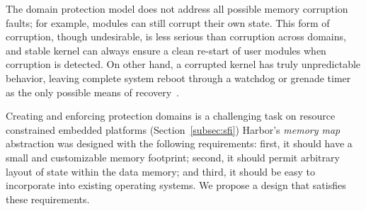 The domain protection model does not address all possible memory corruption
faults; for example,
% 
modules can still corrupt their own state.
% 
This form of corruption, though undesirable, is less serious than
corruption across domains, and stable kernel can always ensure a clean
re-start of user modules when corruption is detected.
% 
On other hand, a corrupted kernel has truly unpredictable behavior,
leaving complete system reboot through a watchdog or grenade timer as
the only possible means of recovery~\cite{dutta05ipsn}.
%


Creating and enforcing protection domains is a challenging task on
resource constrained embedded platforms (Section~\ref{subsec:sfi})
%
%
%
Harbor's \emph{memory map} abstraction was designed with the following
requirements:
%
first, it should have a small and customizable memory footprint;
%
second, it should permit arbitrary layout of state within the data memory;
%
and third, it should be easy to incorporate into existing
operating systems.
%
We propose a design that satisfies these requirements.
%
